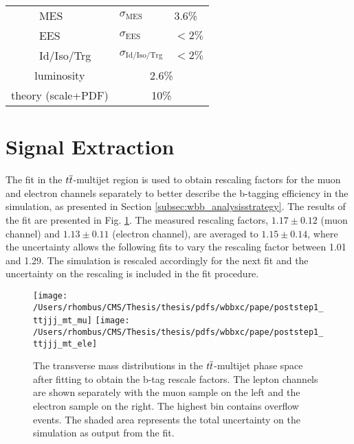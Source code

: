 \begin{table}[htb]
\begin{center}
{\begin{tabular}{c|c|l|l|l}
            {}                                   &           {}                                  & MES           & $\sigma_{\mathrm{MES}}$ & 3.6\% \\
            {}                                   &           {}                                  & EES           & $\sigma_{\mathrm{EES}}$ & $<2\%$ \\ %
            {}                                   &           {}                                  & Id/Iso/Trg    & $\sigma_{\mathrm{Id/Iso/Trg}}$ & $<2\%$ \\
\hline
\hline
            \multicolumn{3}{c|}{luminosity}         & \multicolumn{2}{c}{2.6\%}  \\
            \multicolumn{3}{c|}{theory (scale+PDF)} & \multicolumn{2}{c}{10\%}   \\


\end{tabular}
}
\end{center}
\end{table}

\section{Signal Extraction}

\label{sec:results}

The fit in the $\ttbar$-multijet region
 is used to obtain rescaling factors for
 the muon and electron channels separately
 to better describe the
 b-tagging efficiency in the simulation,
 as presented in Section \ref{subsec:wbb_analysisstrategy}.
The results of the fit are presented in Fig. \ref{fig:step1_ttjjj_fitted}.
The measured rescaling factors, $1.17 \pm 0.12$ (muon channel) and
 $1.13 \pm 0.11$ (electron channel), are averaged to $1.15 \pm 0.14$, where
 the uncertainty allows the following fits to
 vary the rescaling factor between 1.01 and 1.29.
The simulation is rescaled accordingly for the next fit and
 the uncertainty on the rescaling is included in the fit procedure.

\begin{figure}[htbp]
\caption[$\ttbar$-multijet control region after fitting for b-tag scale]
 {
  The transverse mass distributions in the $\ttbar$-multijet phase space after fitting to obtain the b-tag rescale factors.
  The lepton channels are shown separately with the muon sample on the left and the electron sample on the right.
  The highest bin contains overflow events.
 The shaded area represents the total uncertainty on the simulation as output from the fit.
 }
\center
\texttt{[image: /Users/rhombus/CMS/Thesis/thesis/pdfs/wbbxc/pape/poststep1\_ttjjj\_mt\_mu]}
\texttt{[image: /Users/rhombus/CMS/Thesis/thesis/pdfs/wbbxc/pape/poststep1\_ttjjj\_mt\_ele]}
\label{fig:step1_ttjjj_fitted}
\end{figure}


